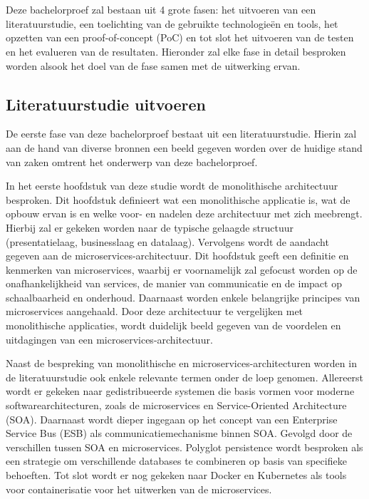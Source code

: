 
\chapter{}%
\label{ch:methodologie}

Deze bachelorproef zal bestaan uit 4 grote fasen: het uitvoeren van een literatuurstudie, een toelichting van de gebruikte technologieën en tools, het opzetten van een proof-of-concept (PoC) en tot slot het uitvoeren van de testen en het evalueren van de resultaten. Hieronder zal elke fase in detail besproken worden alsook het doel van de fase samen met de uitwerking ervan.

\section{Literatuurstudie uitvoeren}

De eerste fase van deze bachelorproef bestaat uit een literatuurstudie. Hierin zal aan de hand van diverse bronnen een beeld gegeven worden over de huidige stand van zaken omtrent het onderwerp van deze bachelorproef.\newline 

In het eerste hoofdstuk van deze studie wordt de monolithische architectuur besproken. Dit hoofdstuk definieert wat een monolithische applicatie is, wat de opbouw ervan is en welke voor- en nadelen deze architectuur met zich meebrengt. Hierbij zal er gekeken worden naar de typische gelaagde structuur (presentatielaag, businesslaag en datalaag). Vervolgens wordt de aandacht gegeven aan de microservices-architectuur. Dit hoofdstuk geeft een definitie en kenmerken van microservices, waarbij er voornamelijk zal gefocust worden op de onafhankelijkheid van services, de manier van communicatie en de impact op schaalbaarheid en onderhoud. Daarnaast worden enkele belangrijke principes van microservices aangehaald. Door deze architectuur te vergelijken met monolithische applicaties, wordt duidelijk beeld gegeven van de voordelen en uitdagingen van een microservices-architectuur.\newline

Naast de bespreking van monolithische en microservices-architecturen worden in de literatuurstudie ook enkele relevante termen onder de loep genomen. Allereerst wordt er gekeken naar gedistribueerde systemen die basis vormen voor moderne softwarearchitecturen, zoals de microservices en Service-Oriented Architecture (SOA). Daarnaast wordt dieper ingegaan op het concept van een Enterprise Service Bus (ESB) als communicatiemechanisme binnen SOA. Gevolgd door de verschillen tussen SOA en microservices. Polyglot persistence wordt besproken als een strategie om verschillende databases te combineren op basis van specifieke behoeften. Tot slot wordt er nog gekeken naar Docker en Kubernetes als tools voor containerisatie voor het uitwerken van de microservices.

